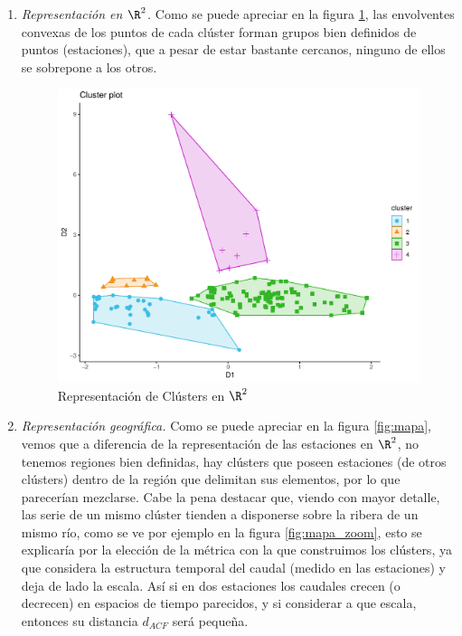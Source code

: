 \documentclass[12pt,oneside]{book}\usepackage[]{graphicx}\usepackage[]{color}
\theoremstyle{definition} %
\begin{document}
\begin{enumerate}

\item \textit{Representación en $\R^2$.} Como se puede apreciar en la figura \ref{fig:puntosR2}, las envolventes convexas de los puntos de cada clúster forman grupos bien definidos de puntos (estaciones), que a pesar de estar bastante cercanos, ninguno de ellos se sobrepone a los otros.

\begin{figure}[H]
\centering
\includegraphics[scale=0.65]{Resultados/2_plot_cluster_dimensiones}
\caption{Representación de Clústers en $\R^2$ }\label{fig:puntosR2}
\end{figure}




\item \textit{Representación geográfica.} Como se puede apreciar en la figura \ref{fig:mapa}, vemos que a diferencia de la representación de las estaciones en $\R^2$, no tenemos regiones bien definidas, hay clústers que poseen estaciones (de otros clústers) dentro de la región que delimitan sus elementos, por lo que parecerían mezclarse. Cabe la pena destacar que, viendo con mayor detalle, las serie de un mismo clúster tienden a disponerse sobre la ribera de un mismo río, como se ve por ejemplo en la figura \ref{fig:mapa_zoom}, esto se explicaría por la elección de la métrica con la que construimos los clústers, ya que considera la estructura temporal del caudal (medido en las estaciones) y deja de lado la escala. Así si en dos estaciones los caudales crecen (o decrecen) en espacios de tiempo parecidos, y si considerar a que escala, entonces su distancia $d_{ACF}$ será pequeña.



\end{enumerate}
\end{document}
